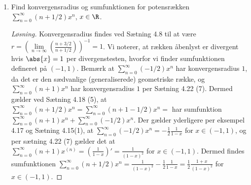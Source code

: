 \begin{opg}
\begin{enumerate}
\begin{proof}[Løsning]
		\end{proof}
		\fi
					\item Find konvergensradius og sumfunktionen for potensrækken $ \sum_{n=0}^{\infty}(n+1/2)x^n $, $ x\in\R $.
					\ifanswers
					\begin{proof}[Løsning]
						Konvergensradius findes ved Sætning 4.8 til at være $ r=\left(\lim\limits_{n\to\infty}\left(\frac{n+3/2}{n+1/2}\right)\right)^{-1}=1 $. Vi noterer, at rækken åbenlyst er divergent hvis $ \abs{x}=1 $ per divergenstesten, hvorfor vi finder sumfunktionen defineret på $ (-1,1) $. Bemærk at $ \sum_{n=0}^{\infty}(-1/2)x^n $ har konvergensradius $ 1 $, da det er den sædvanlige (generaliserede) geometriske række, og $ \sum_{n=0}^{\infty}(n+1)x^n $ har konvergensradius $ 1 $ per Sætning 4.22 (7). Dermed gælder ved Sætning 4.18 (5), at $ \sum_{n=0}^{\infty}(n+1/2)x^n=\sum_{n=0}^{\infty}(n+1-1/2)x^n= $ har sumfunktion $ \sum_{n=0}^{\infty}(n+1)x^n+\sum_{n=0}^{\infty}(-1/2)x^n  $. Der gælder yderligere per eksempel 4.17 og Sætning 4.15(1), at $ \sum_{n=0}^{\infty}(-1/2)x^n=-\frac{1}{2}\frac{1}{1-x} $ for $x\in (-1,1) $, og per sætning 4.22 (7) gælder det at $ \sum_{n=0}^{\infty}(n+1)x^{(n)}=\left(\frac{1}{1-x}\right)'=\frac{1}{(1-x)^2} $ for $ x\in(-1,1) $. Dermed findes sumfunktionen $ \sum_{n=0}^{\infty}(n+1/2)x^n =\frac{1}{(1-x)^2}-\frac{1}{2}\frac{1}{1-x}=\frac{1}{2}\frac{1+x}{(1-x)^2} $ for $ x\in(-1,1) $.	
					\end{proof}
					\fi
	\end{enumerate}
\end{opg}
	
